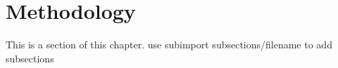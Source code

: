 
\section{Methodology}
This is a section of this chapter.
use subimport {subsections/}{filename} to add subsections
